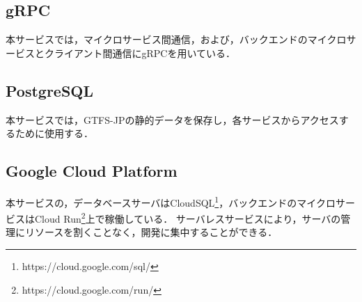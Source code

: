 \subsection{gRPC}
本サービスでは，マイクロサービス間通信，および，バックエンドのマイクロサービスとクライアント間通信にgRPCを用いている．

\subsection{PostgreSQL}
本サービスでは，GTFS-JPの静的データを保存し，各サービスからアクセスするために使用する．

\subsection{Google Cloud Platform}
本サービスの，データベースサーバはCloudSQL\footnote{https://cloud.google.com/sql/}，バックエンドのマイクロサービスはCloud Run\footnote{https://cloud.google.com/run/}上で稼働している．
サーバレスサービスにより，サーバの管理にリソースを割くことなく，開発に集中することができる．
